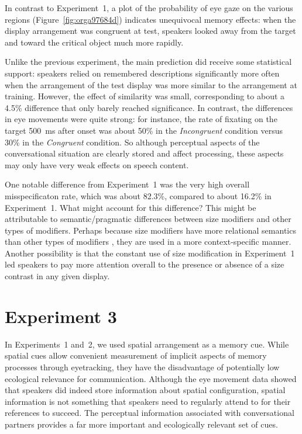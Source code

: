 \documentclass[natbib,man,a4paper]{apa6}
\begin{document}
In contrast to Experiment~1, a plot of the probability of eye gaze on the various regions (Figure~\ref{fig:orga97684d}) indicates unequivocal memory effects: when the display arrangement was congruent at test, speakers looked away from the target and toward the critical object much more rapidly.

Unlike the previous experiment, the main prediction did receive some statistical support: speakers relied on remembered descriptions significantly more often when the arrangement of the test display was more similar to the arrangement at training.  However, the effect of similarity was small, corresponding to about a 
4.5\%
difference that only barely reached significance. In contrast, the differences in eye movements were quite strong: for instance, the rate of fixating on the target 500~ms after onset was about 50\% in the \emph{Incongruent} condition versus 30\% in the \emph{Congruent} condition. So although perceptual aspects of the conversational situation are clearly stored and affect processing, these aspects may only have very weak effects on speech content.

One notable difference from Experiment~1 was the very high overall misspecificaton rate, which was about 
82.3\%, compared to about 
16.2\% 
in Experiment~1.  What might account for this difference?  This might be attributable to semantic/pragmatic differences between size modifiers and other types of modifiers. Perhaps because size modifiers have more relational semantics than other types of modifiers \citep{GrodnerSedivy2011}, they are used in a more context-specific manner. Another possibility is that the constant use of size modification in Experiment~1 led speakers to pay more attention overall to the presence or absence of a size contrast in any given display.

\section*{Experiment 3}
\label{sec:org6f0c301}

In Experiments~1 and~2, we used spatial arrangement as a memory cue. While spatial cues allow convenient measurement of implicit aspects of memory processes through eyetracking, they have the disadvantage of potentially low ecological relevance for communication. Although the eye movement data showed that speakers did indeed store information about spatial configuration, spatial information is not something that speakers need to regularly attend to for their references to succeed. The perceptual information associated with conversational partners provides a far more important and ecologically relevant set of cues.
\end{document}
